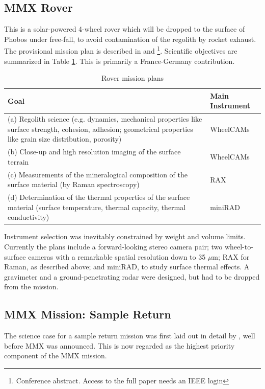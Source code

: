 \subsection{MMX Rover} 

This is a solar-powered 4-wheel rover which will be dropped to the surface of Phobos under free-fall, to avoid contamination of the regolith by rocket exhaust. The provisional mission plan is described in \citet{ulamec_rover_2019} and \citet{vayugundla_mmx_2021}\footnote{Conference abstract. Access to the full paper needs an IEEE login}.  Scientific objectives are summarized in Table \ref{table:rover}. This is primarily a France-Germany contribution.

\begin{table}[hbt!]
	\centering 
	\renewcommand\cellgape{\Gape[5pt]}
	\caption{Rover mission plans}
	\label{table:rover}
	\small
	\begin{tabular}{|p{11.5cm}|p{3.2cm}|}
		\hline
		\textbf{Goal} & \textbf{Main Instrument} \\
		\hline
		(a) Regolith science (e.g. dynamics, mechanical properties like surface strength, cohesion, adhesion; geometrical properties like grain size distribution, porosity) & WheelCAMs \\
		(b) Close-up and high resolution imaging of the surface terrain & WheelCAMs \\
		(c) Measurements of the mineralogical composition of the surface material (by Raman spectroscopy) & RAX \\
		(d) Determination of the thermal properties of the surface material (surface temperature, thermal capacity, thermal conductivity) & miniRAD \\
		\hline
	\end{tabular}
\end{table}

Instrument selection was inevitably constrained by weight and volume limits. Currently the plans include a forward-looking stereo camera pair; two wheel-to-surface cameras with a remarkable spatial resolution down to 35 $\mu$m; RAX for Raman, as described above; and miniRAD, to study surface thermal effects. A gravimeter and a ground-penetrating radar were designed, but had to be dropped from the mission. 

\subsection{MMX Mission: Sample Return}

The science case for a sample return mission was first laid out in detail by \citet{murchie_value_2014}, well before MMX was announced. This is now regarded as the highest priority component of the MMX mission.

